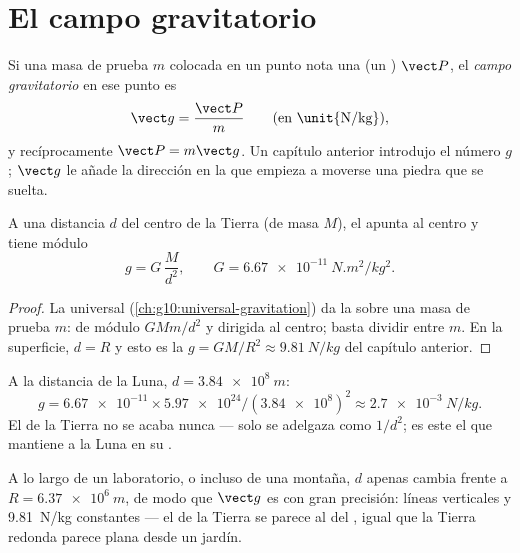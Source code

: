 \section{El campo gravitatorio}

\begin{definition}\label{def:g11:electric-gravitational-fields:gfield}
Si una masa de prueba $m$ colocada en un punto nota una  (un ) $\vect P$, el \emph{campo
gravitatorio} en ese punto es
\[
\vect g = \frac{\vect P}{m} \qquad \text{(en \unit{N/kg})},
\]
y recíprocamente $\vect P = m \vect g$. Un capítulo anterior introdujo
el número $g$; $\vect g$ le añade la dirección en la que empieza a
moverse una piedra que se suelta.
\end{definition}

\begin{proposition}\label{prop:g11:electric-gravitational-fields:earth}
A una distancia $d$ del centro de la Tierra (de masa $M$), el  apunta al centro y tiene módulo
\[
g = G\,\frac{M}{d^2},
\qquad G = \qty{6.67e-11}{N.m^2/kg^2}.
\]
\end{proposition}

\begin{proof}
La  universal (\cref{ch:g10:universal-gravitation}) da la
 sobre una masa de prueba $m$: de módulo $G M m / d^2$ y dirigida
al centro; basta dividir entre $m$. En la superficie, $d = R$ y esto es
la $g = GM/R^2 \approx \qty{9.81}{N/kg}$ del capítulo anterior.
\end{proof}

\begin{example}\label{ex:g11:electric-gravitational-fields:moon}
A la distancia de la Luna, $d = \qty{3.84e8}{m}$:
\[
g = \num{6.67e-11} \times \num{5.97e24} / (\num{3.84e8})^2
\approx \qty{2.7e-3}{N/kg}.
\]
El  de la Tierra no se acaba nunca --- solo se adelgaza como
$1/d^2$; es este  el que mantiene a la Luna en su .
\end{example}

\begin{remark}\label{rem:g11:electric-gravitational-fields:uniformg}
A lo largo de un laboratorio, o incluso de una montaña, $d$ apenas
cambia frente a $R = \qty{6.37e6}{m}$, de modo que $\vect g$ es 
con gran precisión: líneas verticales y \qty{9.81}{N/kg} constantes ---
el  de la Tierra se parece al del , igual que la Tierra
redonda parece plana desde un jardín.
\end{remark}

